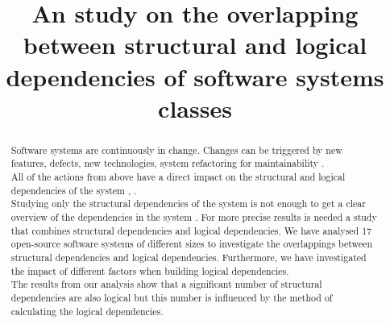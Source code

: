 \documentclass[conference,compsoc]{IEEEtran}
\begin{document}
\title{An study on the overlapping between structural and logical\\ dependencies of software systems classes 
}


\author{
\and
{}
}

\maketitle

\begin{abstract}
Software systems are continuously in change. Changes can be triggered by new features, defects, new technologies, system refactoring for maintainability \cite{ct1}.\\ All of the actions from above have a direct impact on the structural and logical dependencies of the system \cite{ct8}, \cite{ct6}.\\Studying only the structural dependencies of the system is not enough to get a clear overview of the dependencies in the system . For more precise results is needed a study that combines structural dependencies and logical dependencies. We have analysed 17 open-source software systems of different sizes to investigate the overlappings between structural dependencies and logical dependencies. Furthermore, we have investigated the impact of different factors when building logical dependencies.\\The results from our analysis show that a significant number of structural dependencies are also logical but this number is influenced by the method of calculating the logical dependencies.

\end{abstract}

\IEEEpeerreviewmaketitle
\end{document}
